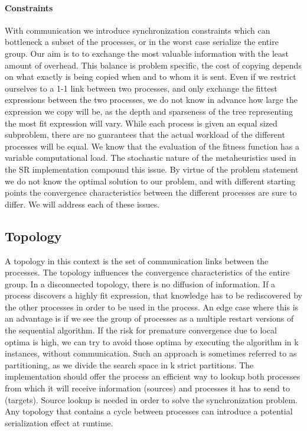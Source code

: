 \paragraph{Constraints}
With communication we introduce synchronization constraints which can bottleneck a subset of the processes, or in the worst case serialize the entire group. Our aim is to to exchange the most valuable information with the least amount of overhead. This balance is problem specific, the cost of copying depends on what exactly is being copied when and to whom it is sent. Even if we restrict ourselves to a 1-1 link between two processes, and only exchange the fittest expressions between the two processes, we do not know in advance how large the expression we copy will be, as the depth and sparseness of the tree representing the most fit expression will vary.
While each process is given an equal sized subproblem, there are no guarantees that the actual workload of the different processes will be equal. We know that the evaluation of the fitness function has a variable computational load. The stochastic nature of the metaheuristics used in the SR implementation compound this issue. By virtue of the problem statement we do not know the optimal 
solution to our problem, and with different starting points the convergence characteristics between the different processes are sure to differ. We will address each of these issues.

\subsection{Topology}
A topology in this context is the set of communication links between the processes. The topology influences the convergence characteristics of the entire group. In a disconnected topology, there is no diffusion of information. If a process discovers a highly fit expression, that knowledge has to be rediscovered by the other processes in order to be used in the process. An edge case where this is an advantage is if we see the group of processes as a multiple restart versions of the sequential algorithm. If the risk for premature convergence due to local optima is high, we can try to avoid those optima by executing the algorithm in k instances, without communication. Such an approach is sometimes referred to as partitioning, as we divide the search space in k strict partitions.
The implementation should offer the process an efficient way to lookup both processes from which it will receive information (sources) and processes it has to send to (targets). Source lookup is needed in order to solve the synchronization problem. Any topology that contains a cycle between processes can introduce a potential serialization effect at runtime.

